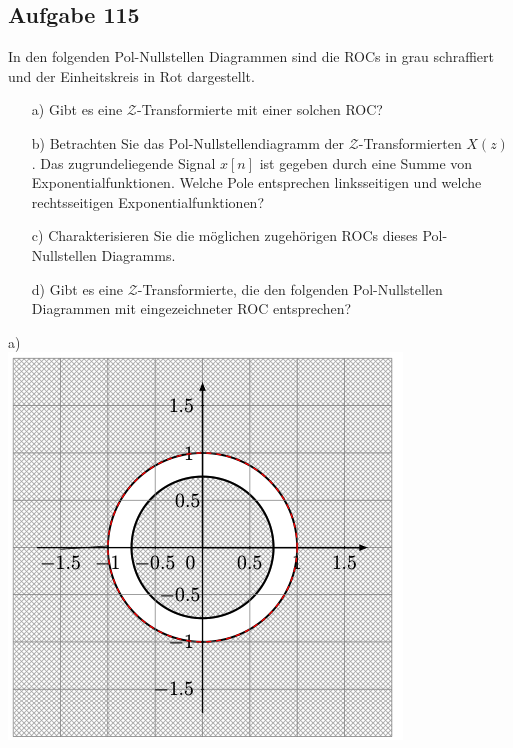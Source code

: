 \documentclass[11pt]{article}
\begin{document}
\pagebreak

\subsection*{Aufgabe 115}
\vspace*{-0.5cm}
In den folgenden Pol-Nullstellen Diagrammen sind die ROCs in grau schraffiert und der Einheitskreis in Rot dargestellt.
\vspace*{-0.5cm}
\begin{itemize}
    \item[a)] Gibt es eine $\mathcal{Z}$-Transformierte mit einer solchen ROC?
    \item[b)] Betrachten Sie das Pol-Nullstellendiagramm der $\mathcal{Z}$-Transformierten $X(z)$. Das zugrundeliegende Signal $x[n]$ ist gegeben durch eine Summe von Exponentialfunktionen. Welche Pole entsprechen linksseitigen und welche rechtsseitigen Exponentialfunktionen?
    \item[c)] Charakterisieren Sie die möglichen zugehörigen ROCs dieses Pol-Nullstellen Diagramms.
    \item[d)] Gibt es eine $\mathcal{Z}$-Transformierte, die den folgenden Pol-Nullstellen Diagrammen mit eingezeichneter ROC entsprechen?
\end{itemize}
\vspace*{-0.5cm}
\noindent
\begin{minipage}[t]{0.25\textwidth}
    a)\\
    \includegraphics[width=\linewidth]{docimgs/a.png}
\end{minipage}
\end{document}
